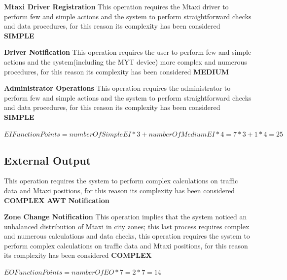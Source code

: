 \documentclass[11pt,titlepage]{article} %
\begin{document}
      \noindent \textbf{Mtaxi Driver Registration}\newline
      This operation requires the Mtaxi driver to perform few and simple actions and the system to perform straightforward checks and data procedures,
      for this reason its complexity has been considered \textbf{SIMPLE}\newline\newline
      
      \noindent \textbf{Driver Notification}\newline
      This operation requires the user to perform few and simple actions and the system(including the MYT device) more complex and numerous procedures,
      for this reason its complexity has been considered \textbf{MEDIUM}\newline\newline
      
      \noindent \textbf{Administrator Operations}\newline
      This operation requires the administrator to perform few and simple actions and the system to perform straightforward checks and data procedures,
      for this reason its complexity has been considered \textbf{SIMPLE}\newline
      
      \begin{center}
	$ EI Function Points = numberOfSimpleEI * 3 + numberOfMediumEI * 4 = 7 * 3 + 1 * 4 = 25 $
      \end{center}
    
    \subsection{External Output}
      This operation requires the system to perform complex calculations on traffic data and Mtaxi positions, for this reason its complexity has been considered \textbf{COMPLEX}\newline\newline
      \textbf{AWT Notification}\newline
      
      \textbf{Zone Change Notification}\newline
      This operation implies that the system noticed an unbalanced distribution of Mtaxi in city zones; this last process requires complex and numerous
      calculations and data checks, this operation requires the system to perform complex calculations on traffic data and Mtaxi positions, for this reason its complexity has been considered \textbf{COMPLEX}\newline
      \begin{center}
	$ EO Function Points = numberOfEO * 7 = 2 * 7 = 14 $
      \end{center}
      
\end{document}
